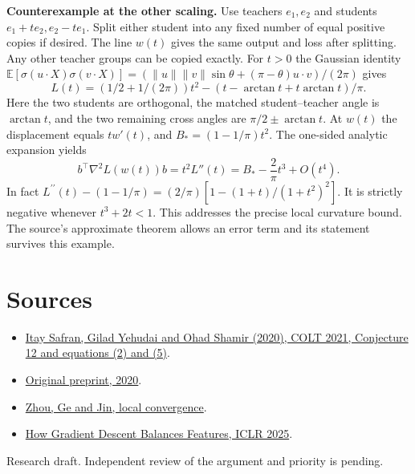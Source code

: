 \documentclass[10pt]{article}
\begin{document}
\textbf{Counterexample at the other scaling.} Use teachers $e_1,e_2$ and students $e_1+t e_2,e_2-t e_1$. Split either student into any fixed number of equal positive copies if desired. The line $w(t)$ gives the same output and loss after splitting. Any other teacher groups can be copied exactly. For $t>0$ the Gaussian identity $\mathbb E[\sigma(u\cdot X)\sigma(v\cdot X)]=(\|u\|\|v\|\sin\theta+(\pi-\theta)u\cdot v)/(2\pi)$ gives
\[
 L(t)=(1/2+1/(2\pi))t^2-(t-\arctan t+t\arctan t)/\pi .
\]
Here the two students are orthogonal, the matched student--teacher angle is $\arctan t$, and the two remaining cross angles are $\pi/2\pm\arctan t$. At $w(t)$ the displacement equals $t w'(t)$, and $B_*=(1-1/\pi)t^2$. The one-sided analytic expansion yields
\[
 b^\top\nabla^2L(w(t))b=t^2L''(t)=B_*-\frac{2}{\pi}t^3+O(t^4).
\]
In fact $L^{\prime\prime}(t)-(1-1/\pi)=(2/\pi)[1-(1+t)/(1+t^2)^2]$. It is strictly negative whenever $t^3+2t<1$. This addresses the precise local curvature bound. The source's approximate theorem allows an error term and its statement survives this example.

\section*{Sources}
\begin{itemize}
\item \href{https://proceedings.mlr.press/v134/safran21a.html}{Itay Safran, Gilad Yehudai and Ohad Shamir (2020), COLT 2021, Conjecture 12 and equations (2) and (5)}.
\item \href{https://arxiv.org/abs/2006.01005}{Original preprint, 2020}.
\item \href{https://proceedings.mlr.press/v134/zhou21b.html}{Zhou, Ge and Jin, local convergence}.
\item \href{https://proceedings.iclr.cc/paper_files/paper/2025/hash/1a0923d14475272896d54248586af67e-Abstract-Conference.html}{How Gradient Descent Balances Features, ICLR 2025}.
\end{itemize}
{\small Research draft. Independent review of the argument and priority is pending.}
\end{document}

